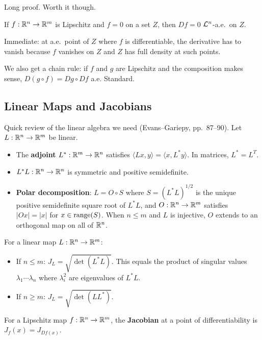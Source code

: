 Long proof. Worth it though.

\begin{corollary}
\label{cor:lip-zero-deriv}
If $f : \mathbb{R}^n \to \mathbb{R}^m$ is Lipschitz and $f = 0$ on a set $Z$, then $Df = 0$ $\mathcal{L}^n$-a.e.\ on $Z$.
\end{corollary}

Immediate: at a.e.\ point of $Z$ where $f$ is differentiable, the derivative has to vanish because $f$ vanishes on $Z$ and $Z$ has full density at such points.

We also get a chain rule: if $f$ and $g$ are Lipschitz and the composition makes sense, $D(g \circ f) = Dg \circ Df$ a.e. Standard.


\subsection{Linear Maps and Jacobians}
\label{def:jacobian}

Quick review of the linear algebra we need (Evans--Gariepy, pp.~87--90). Let $L : \mathbb{R}^n \to \mathbb{R}^m$ be linear.

\begin{itemize}
  \item The \textbf{adjoint} $L^* : \mathbb{R}^m \to \mathbb{R}^n$ satisfies $\langle Lx, y \rangle = \langle x, L^*y \rangle$. In matrices, $L^* = L^T$.
  \item $L^* L : \mathbb{R}^n \to \mathbb{R}^n$ is symmetric and positive semidefinite.
  \item \textbf{Polar decomposition}: $L = O \circ S$ where $S = (L^*L)^{1/2}$ is the unique positive semidefinite square root of $L^*L$, and $O : \mathbb{R}^n \to \mathbb{R}^m$ satisfies $|Ox| = |x|$ for $x \in \operatorname{range}(S)$. When $n \leq m$ and $L$ is injective, $O$ extends to an orthogonal map on all of $\mathbb{R}^n$.
\end{itemize}

\begin{definition}[Jacobian]
For a linear map $L : \mathbb{R}^n \to \mathbb{R}^m$:
\begin{itemize}
  \item If $n \leq m$: $J_L = \sqrt{\det(L^* L)}$. This equals the product of singular values $\lambda_1 \cdots \lambda_n$ where $\lambda_i^2$ are eigenvalues of $L^*L$.
  \item If $n \geq m$: $J_L = \sqrt{\det(L L^*)}$.
\end{itemize}
For a Lipschitz map $f : \mathbb{R}^n \to \mathbb{R}^m$, the \textbf{Jacobian} at a point of differentiability is $J_f(x) = J_{Df(x)}$.
\end{definition}

